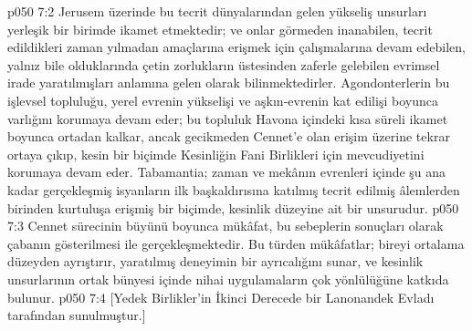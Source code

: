 \vs p050 7:2 Jerusem üzerinde bu tecrit dünyalarından gelen yükseliş unsurları yerleşik bir birimde ikamet etmektedir; ve onlar görmeden inanabilen, tecrit edildikleri zaman yılmadan amaçlarına erişmek için çalışmalarına devam edebilen, yalnız bile olduklarında çetin zorlukların üstesinden zaferle gelebilen evrimsel irade yaratılmışları anlamına gelen  olarak bilinmektedirler. Agondonterlerin bu işlevsel topluluğu, yerel evrenin yükselişi ve aşkın\hyp{}evrenin kat edilişi boyunca varlığını korumaya devam eder; bu topluluk Havona içindeki kısa süreli ikamet boyunca ortadan kalkar, ancak gecikmeden Cennet’e olan erişim üzerine tekrar ortaya çıkıp, kesin bir biçimde Kesinliğin Fani Birlikleri için mevcudiyetini korumaya devam eder. Tabamantia; zaman ve mekânın evrenleri içinde şu ana kadar gerçekleşmiş isyanların ilk başkaldırısına katılmış tecrit edilmiş âlemlerden birinden kurtuluşa erişmiş bir biçimde, kesinlik düzeyine ait bir  unsurudur.
\vs p050 7:3 Cennet sürecinin büyünü boyunca mükâfat, bu sebeplerin sonuçları olarak çabanın gösterilmesi ile gerçekleşmektedir. Bu türden mükâfatlar; bireyi ortalama düzeyden ayrıştırır, yaratılmış deneyimin bir ayrıcalığını sunar, ve kesinlik unsurlarının ortak bünyesi içinde nihai uygulamaların çok yönlülüğüne katkıda bulunur.
\vs p050 7:4 [Yedek Birlikler’in İkinci Derecede bir Lanonandek Evladı tarafından sunulmuştur.]
